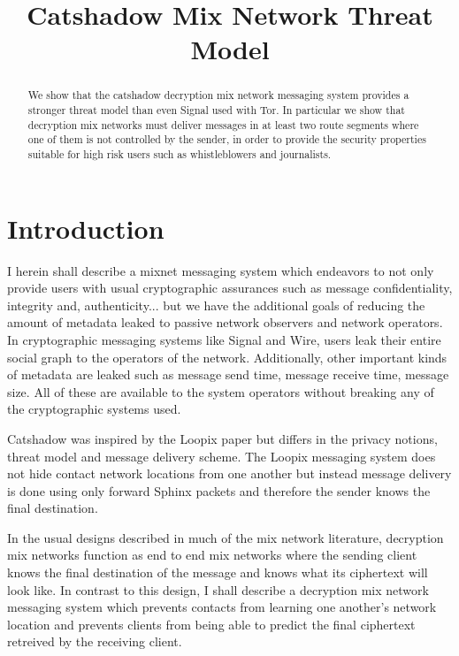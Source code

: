 \documentclass[conference]{IEEEtran}
\begin{document}
\title{Catshadow Mix Network Threat Model}
\author{
\IEEEauthorblockA{}
}
\maketitle

\begin{abstract}
We show that the catshadow decryption mix network messaging system
provides a stronger threat model than even Signal used with Tor.
In particular we show that decryption mix networks must deliver messages
in at least two route segments where one of them is not controlled by
the sender, in order to provide the security properties suitable for
high risk users such as whistleblowers and journalists.
\end{abstract}
\IEEEpeerreviewmaketitle

\section{Introduction}
I herein shall describe a mixnet messaging system which endeavors to
not only provide users with usual cryptographic assurances such as
message confidentiality, integrity and, authenticity... but we have
the additional goals of reducing the amount of metadata leaked to
passive network observers and network operators. In cryptographic
messaging systems like Signal and Wire, users leak their entire social
graph to the operators of the network. Additionally, other important
kinds of metadata are leaked such as message send time, message
receive time, message size. All of these are available to the system
operators without breaking any of the cryptographic systems used.

Catshadow was inspired by the Loopix paper \cite{piotrowska2017loopix}
but differs in the privacy notions, threat model and message delivery
scheme. The Loopix messaging system does not hide contact network
locations from one another but instead message delivery is done using
only forward Sphinx packets and therefore the sender knows the final
destination.

In the usual designs described in much of the mix network literature,
decryption mix networks function as end to end mix networks where the
sending client knows the final destination of the message and knows
what its ciphertext will look like. In contrast to this design, I 
shall describe a decryption mix network messaging system which
prevents contacts from learning one another's network location and
prevents clients from being able to predict the final ciphertext
retreived by the receiving client.
\end{document}
